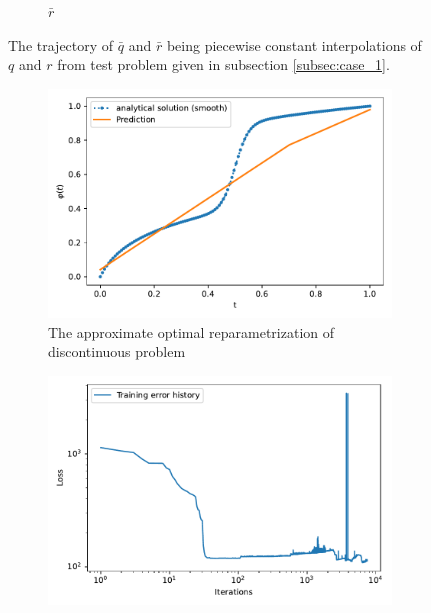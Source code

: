 \begin{figure}[b]
\begin{subfigure}[t]{0.5\textwidth}
        \caption{\(\bar r\)}\label{fig:curve_1_pc_r}
    \end{subfigure}
    \caption{The trajectory of \(\bar q\) and \(\bar r\) being piecewise constant interpolations of  \(q\) and  \(r\) from test problem  given in subsection \ref{subsec:case_1}.}\label{fig:curve_1_pc}
\end{figure}

\begin{figure}[t]
    \begin{subfigure}[t]{0.5\textwidth}
        \centering
        \includegraphics[width=\linewidth]{figures/curve_1_pc/eks_2/plot_0_0.pdf}
        \caption{The approximate optimal reparametrization of discontinuous problem}\label{fig:curve_1_pc_solution}
    \end{subfigure}
    \begin{subfigure}[t]{0.5\textwidth}
        \centering
        \includegraphics[width=\linewidth]{figures/curve_1_pc/eks_2/history_plot_0.pdf}

\end{subfigure}
\end{figure}
